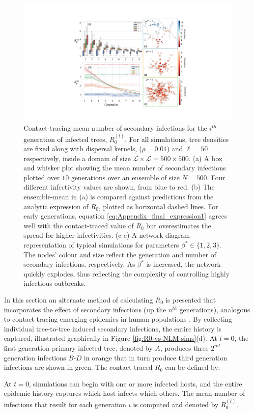 \begin{figure}
    \centering
    \includegraphics[scale=0.475]{chapter5/figures/fig5-R0-contact.pdf}
    \caption{Contact-tracing mean number of secondary infections for the $i^{th}$ generation of infected trees, $R^{(i)}_0$. For all simulations, tree densities are fixed along with dispersal kernels, ($\rho=0.01$) and $\ell=50$ respectively, inside a domain of size $\mathcal{L \times L} = 500 \times 500$.
    (a) A box and whisker plot showing the mean number of secondary infections plotted over $10$ generations over an ensemble of size $N=500$. Four different infectivity values are shown, from blue to red. (b) The ensemble-mean in (a) is compared against predictions from the analytic expression of $R_0$, plotted as horizontal dashed lines. For early generations, equation \ref{eq:Appendix_final_expression1} agrees well with the contact-traced value of $R_0$ but overestimates the spread for higher infectivities. (c-e) A network diagram representation of typical simulations for parameters $\beta^* \in \lbrace 1, 2, 3 \rbrace $. The nodes' colour and size reflect the generation and number of secondary infections, respectively. As $\beta^*$ is increased, the network quickly explodes\textemdash, thus reflecting the complexity of controlling highly infectious outbreaks.}
    \label{fig:contact-trace}
\end{figure}


In this section an alternate method of calculating $R_0$ is presented that incorporates the effect of secondary infections  
(up the $n^{th}$ generations), analogous to contact-tracing emerging epidemics in human populations \cite{eames2003contact}.
By collecting individual tree-to-tree induced secondary infections, the entire history is captured, illustrated graphically in Figure \ref{fig:R0-vs-NLM-sims}(d).
At $t=0$, the first generation primary infected tree, denoted by $A$, produces three $2^{nd}$ generation infections $B$-$D$ in orange that in turn produce
third generation infections are shown in green.
The contact-traced $R_0$ can be defined by:
\begin{defn} %
\label{def:R0_contact_traced}
At $t=0$, simulations can begin with one or more infected hosts, and the entire epidemic history captures which host infects which others.
The mean number of infections that result for each generation $i$ is computed and denoted by $R^{(i)}_0$.
\end{defn}

